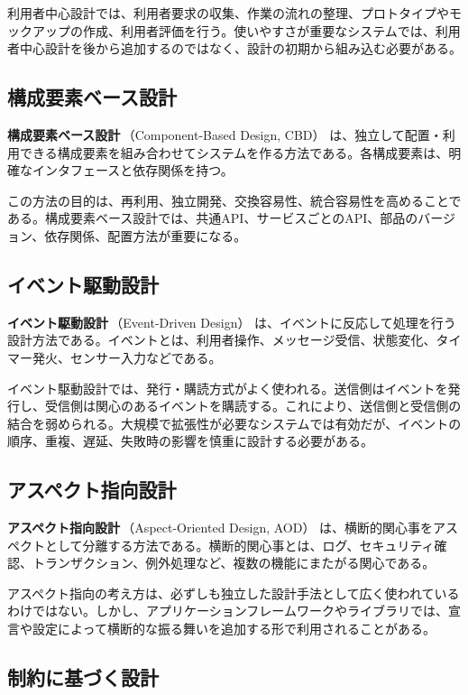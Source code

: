 \documentclass[10.5pt,a4paper]{ltjsarticle}
\newcommand{\term}[2]{\textbf{#1}\,（#2）}
\begin{document}
利用者中心設計では、利用者要求の収集、作業の流れの整理、プロトタイプやモックアップの作成、利用者評価を行う。使いやすさが重要なシステムでは、利用者中心設計を後から追加するのではなく、設計の初期から組み込む必要がある。

\subsection{構成要素ベース設計}

\term{構成要素ベース設計}{Component-Based Design, CBD} は、独立して配置・利用できる構成要素を組み合わせてシステムを作る方法である。各構成要素は、明確なインタフェースと依存関係を持つ。

この方法の目的は、再利用、独立開発、交換容易性、統合容易性を高めることである。構成要素ベース設計では、共通API、サービスごとのAPI、部品のバージョン、依存関係、配置方法が重要になる。

\subsection{イベント駆動設計}

\term{イベント駆動設計}{Event-Driven Design} は、イベントに反応して処理を行う設計方法である。イベントとは、利用者操作、メッセージ受信、状態変化、タイマー発火、センサー入力などである。

イベント駆動設計では、発行・購読方式がよく使われる。送信側はイベントを発行し、受信側は関心のあるイベントを購読する。これにより、送信側と受信側の結合を弱められる。大規模で拡張性が必要なシステムでは有効だが、イベントの順序、重複、遅延、失敗時の影響を慎重に設計する必要がある。

\subsection{アスペクト指向設計}

\term{アスペクト指向設計}{Aspect-Oriented Design, AOD} は、横断的関心事をアスペクトとして分離する方法である。横断的関心事とは、ログ、セキュリティ確認、トランザクション、例外処理など、複数の機能にまたがる関心である。

アスペクト指向の考え方は、必ずしも独立した設計手法として広く使われているわけではない。しかし、アプリケーションフレームワークやライブラリでは、宣言や設定によって横断的な振る舞いを追加する形で利用されることがある。

\subsection{制約に基づく設計}
\end{document}
